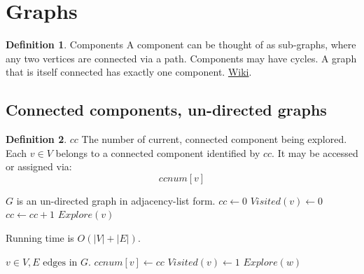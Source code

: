 \documentclass{article}
\theoremstyle{definition}
\newtheorem{definition}{Definition}[section]
\begin{document}
	
\tableofcontents
\listofalgorithms
\section{Graphs}

\begin{definition}{Components}
	A component can be thought of as sub-graphs, where any two vertices are connected via a path. Components may have cycles. A graph that is itself connected has exactly one component.
	\href{https://en.wikipedia.org/wiki/Component_(graph_theory)}{Wiki}. 
\end{definition}

\subsection{Connected components, un-directed graphs}
\label{cc_und}

\begin{definition}{$cc$}
The number of current, connected component being explored. Each $v \in V$ belongs to a connected component identified by $cc$. It may be accessed or assigned via:
$$ccnum[v]$$
\end{definition}

\begin{algorithm}[H]
\caption{$DFS(G)$: Given vertices $V$ in graph $G$, find all strongly connected components.}
\label{alg:dfs_und}
\begin{algorithmic}[1]
\REQUIRE $G$ is an un-directed graph in adjacency-list form.
\STATE $cc \gets 0$
\STATE $Visited(v) \gets 0$
\ENDFOR
{}
	\STATE $cc \gets cc + 1$
	\STATE $Explore(v)$ 
\ENDIF
\ENDFOR
\end{algorithmic}
 Running time is $O(|V|+|E|)$.
\end{algorithm}

\begin{algorithm}[H]
\caption{$Explore(v)$: identifies the connected component containing $v$.}
\label{alg:dfs_und_exp}
\begin{algorithmic}[1]
\REQUIRE $v \in V, E \text{ edges in } G$.
\STATE $ccnum[v] \gets cc$  
\STATE $Visited(v) \gets 1$
	\STATE $Explore(w)$
\ENDIF
\ENDFOR
\end{algorithmic}
\end{algorithm}
\end{document}
